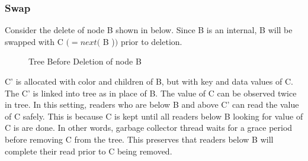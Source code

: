 \subsubsection{Swap}
Consider the delete of node \textsf{B} shown in  below. Since \textsf{B} is an internal, \textsf{B} will be swapped with \textsf{C} $(= next ($ \textsf{B} )$)$ prior to deletion.
\newpage

\begin{figure}
\centering
{}
\caption{Tree Before Deletion of node B}
\end{figure}



\textsf{C'} is allocated with color and children of B, but with key and data  values of C.  The \textsf{C'} is linked into tree as in place of \textsf{B}. The value of \textsf{C} can be  observed twice in tree. In this setting, readers who are below \textsf{B} and above \textsf{C'} can read the value of \textsf{C} safely.
This is because \textsf{C} is kept until all readers below \textsf{B} looking for value of \textsf{C} is are done. In other words, garbage collector thread waits for a grace period before removing \textsf{C} from the tree. This preserves that readers below \textsf{B} will complete their read prior to \textsf{C} being removed.

